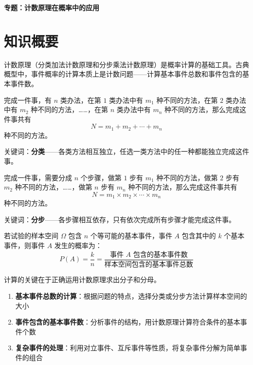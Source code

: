 \documentclass[11pt]{ctexrep}
\begin{document}
\begin{center}
    {\LARGE\bfseries 专题：计数原理在概率中的应用}
\end{center}

\section*{知识概要}

计数原理（分类加法计数原理和分步乘法计数原理）是概率计算的基础工具。古典概型中，事件概率的计算本质上是计数问题——计算基本事件总数和事件包含的基本事件数。

\begin{definition}[分类加法计数原理]
    完成一件事，有 $n$ 类办法，在第 $1$ 类办法中有 $m_1$ 种不同的方法，在第 $2$ 类办法中有 $m_2$ 种不同的方法，……，在第 $n$ 类办法中有 $m_n$ 种不同的方法，那么完成这件事共有
    \[
        N = m_1 + m_2 + \cdots + m_n
    \]
    种不同的方法。
    
    关键词：\textbf{分类}——各类方法相互独立，任选一类方法中的任一种都能独立完成这件事。
\end{definition}

\begin{definition}[分步乘法计数原理]
    完成一件事，需要分成 $n$ 个步骤，做第 $1$ 步有 $m_1$ 种不同的方法，做第 $2$ 步有 $m_2$ 种不同的方法，……，做第 $n$ 步有 $m_n$ 种不同的方法，那么完成这件事共有
    \[
        N = m_1 \times m_2 \times \cdots \times m_n
    \]
    种不同的方法。
    
    关键词：\textbf{分步}——各步骤相互依存，只有依次完成所有步骤才能完成这件事。
\end{definition}

\begin{property}[古典概型的概率公式]
    若试验的样本空间 $\Omega$ 包含 $n$ 个等可能的基本事件，事件 $A$ 包含其中的 $k$ 个基本事件，则事件 $A$ 发生的概率为：
    \[
        P(A) = \frac{k}{n} = \frac{\text{事件 } A \text{ 包含的基本事件数}}{\text{样本空间包含的基本事件总数}}
    \]
    
    计算的关键在于正确运用计数原理求出分子和分母。
\end{property}

\begin{property}[计数原理与概率计算的关联]
    \begin{enumerate}
        \item \textbf{基本事件总数的计算}：根据问题的特点，选择分类或分步方法计算样本空间的大小
        \item \textbf{事件包含的基本事件数}：分析事件的结构，用计数原理计算符合条件的基本事件个数
        \item \textbf{复杂事件的处理}：利用对立事件、互斥事件等性质，将复杂事件分解为简单事件的组合
    \end{enumerate}
\end{property}
\end{document}
